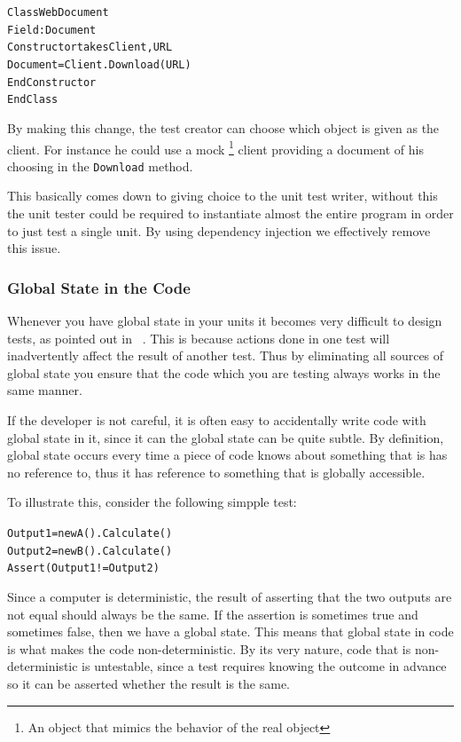 \begin{alltt}
Class WebDocument
    Field: Document 
    Constructor takes Client, URL 		
        Document = Client.Download(URL) 	
    EndConstructor 
EndClass
\end{alltt}

By making this change, the test creator can choose which object is
given as the client. For instance he could use a mock%
\footnote{An object that mimics the behavior of the real object%
} client providing a document of his choosing in the \texttt{Download}
method.

This basically comes down to giving choice to the unit test writer,
without this the unit tester could be required to instantiate almost
the entire program in order to just test a single unit. By using dependency
injection we effectively remove this issue.


\subsubsection*{Global State in the Code}

Whenever you have global state in your units it becomes very difficult
to design tests, as pointed out in ~\cite{LectureSingletons}. This
is because actions done in one test will inadvertently affect the
result of another test. Thus by eliminating all sources of global
state you ensure that the code which you are testing always works
in the same manner.

If the developer is not careful, it is often easy to accidentally
write code with global state in it, since it can the global state
can be quite subtle. By definition, global state occurs every time
a piece of code knows about something that is has no reference to,
thus it has reference to something that is globally accessible.

To illustrate this, consider the following simpple test:

\begin{alltt}
Output1 = new A().Calculate() 
Output2 = new B().Calculate() 
Assert(Output1 != Output2)
\end{alltt}

Since a computer is deterministic, the result of asserting that the
two outputs are not equal should always be the same. If the assertion
is sometimes true and sometimes false, then we have a global state.
This means that global state in code is what makes the code non-deterministic.
By its very nature, code that is non-deterministic is untestable,
since a test requires knowing the outcome in advance so it can be
asserted whether the result is the same.

